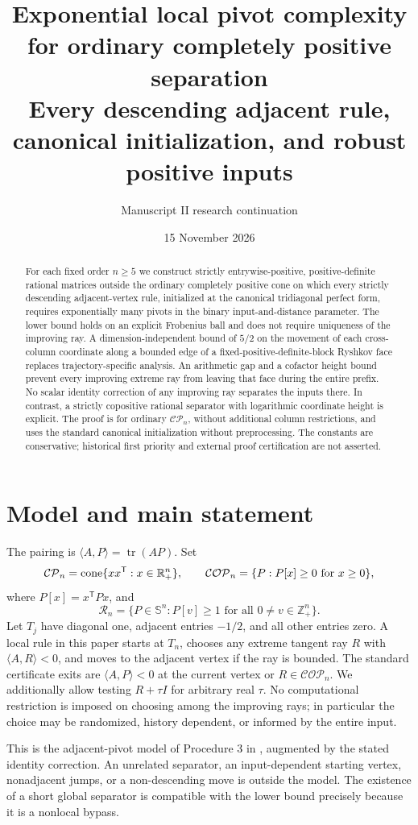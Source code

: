 \documentclass[11pt]{article}
\title{Exponential local pivot complexity for ordinary completely positive separation\\[3pt]\large Every descending adjacent rule, canonical initialization, and robust positive inputs}
\author{Manuscript II research continuation}
\date{15 November 2026}
\theoremstyle{remark}\newtheorem{remark}[theorem]{Remark}
\newcommand{\R}{\mathbb R}\newcommand{\Q}{\mathbb Q}\newcommand{\Z}{\mathbb Z}
\newcommand{\CP}{\mathcal{CP}}\newcommand{\COP}{\mathcal{COP}}
\newcommand{\Ry}{\mathcal R}\newcommand{\tr}{\operatorname{tr}}
\newcommand{\ip}[2]{\langle #1,#2\rangle}\newcommand{\trans}{^{\mathsf T}}
\begin{document}
\maketitle
\begin{abstract}
For each fixed order $n\ge5$ we construct strictly entrywise-positive, positive-definite rational matrices outside the ordinary completely positive cone on which every strictly descending adjacent-vertex rule, initialized at the canonical tridiagonal perfect form, requires exponentially many pivots in the binary input-and-distance parameter. The lower bound holds on an explicit Frobenius ball and does not require uniqueness of the improving ray. A dimension-independent bound of $5/2$ on the movement of each cross-column coordinate along a bounded edge of a fixed-positive-definite-block Ryshkov face replaces trajectory-specific analysis. An arithmetic gap and a cofactor height bound prevent every improving extreme ray from leaving that face during the entire prefix. No scalar identity correction of any improving ray separates the inputs there. In contrast, a strictly copositive rational separator with logarithmic coordinate height is explicit. The proof is for ordinary $\CP_n$, without additional column restrictions, and uses the standard canonical initialization without preprocessing. The constants are conservative; historical first priority and external proof certification are not asserted.
\end{abstract}

\section{Model and main statement}
The pairing is $\ip A P=\tr(AP)$. Set
\[
 \CP_n=\cone\{xx\trans:x\in\R_+^n\},\qquad
 \COP_n=\{P:P[x]\ge0\text{ for }x\ge0\},
\]
where $P[x]=x\trans Px$, and
\[
 \Ry_n=\{P\in\mathbb S^n:P[v]\ge1\text{ for all }0\ne v\in\Z_+^n\}.
\]
Let $T_j$ have diagonal one, adjacent entries $-1/2$, and all other entries zero. A local rule in this paper starts at $T_n$, chooses any extreme tangent ray $R$ with $\ip A R<0$, and moves to the adjacent vertex if the ray is bounded. The standard certificate exits are $\ip A P<0$ at the current vertex or $R\in\COP_n$. We additionally allow testing $R+\tau I$ for arbitrary real $\tau$. No computational restriction is imposed on choosing among the improving rays; in particular the choice may be randomized, history dependent, or informed by the entire input.

This is the adjacent-pivot model of Procedure 3 in \cite{DSV}, augmented by the stated identity correction. An unrelated separator, an input-dependent starting vertex, nonadjacent jumps, or a non-descending move is outside the model. The existence of a short global separator is compatible with the lower bound precisely because it is a nonlocal bypass.
\end{document}
